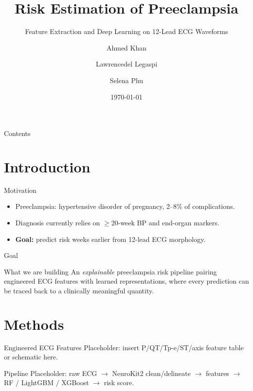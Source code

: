 \documentclass[10pt,aspectratio=169]{beamer}
\title{Risk Estimation of Preeclampsia}
\subtitle{Feature Extraction and Deep Learning on 12-Lead ECG Waveforms}
\author{Ahmed Khan \and Lawrencedel Legaspi \and Selena Phu}
\institute{Department of Electrical and Computer Engineering \\ University of California, Davis}
\date{\today}
\begin{document}
{%
  \begin{frame}
    \titlepage
  \end{frame}
}

\begin{frame}{Contents}
  \tableofcontents
\end{frame}

\section{Introduction}

\begin{frame}{Motivation}
  \begin{itemize}
    \item Preeclampsia: hypertensive disorder of pregnancy, 2--8\% of complications.
    \item Diagnosis currently relies on $\geq$20-week BP and end-organ markers.
    \item \textbf{Goal:} predict risk weeks earlier from 12-lead ECG morphology.
  \end{itemize}
\end{frame}

\begin{frame}{Goal}
  \begin{block}{What we are building}
    An \emph{explainable} preeclampsia risk pipeline pairing engineered ECG
    features with learned representations, where every prediction can be
    traced back to a clinically meaningful quantity.
  \end{block}
\end{frame}

\section{Methods}

\begin{frame}{Engineered ECG Features}
  Placeholder: insert P/QT/Tp-e/ST/axis feature table or schematic here.
\end{frame}

\begin{frame}{Pipeline}
  Placeholder: raw ECG $\rightarrow$ NeuroKit2 clean/delineate $\rightarrow$ features
  $\rightarrow$ RF / LightGBM / XGBoost $\rightarrow$ risk score.
\end{frame}
\end{document}
